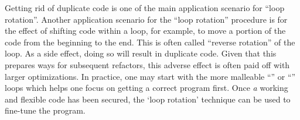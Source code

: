 Getting rid of duplicate code is one of the main application scenario for ``loop rotation''.
Another application scenario for the ``loop rotation'' procedure is for the effect of
shifting code within a loop, for example, to move a portion of the code from the beginning to the
end.
This is often called ``reverse rotation'' of the loop.
As a side effect, doing so will result in duplicate code.
Given that this prepares ways for subsequent refactors, this adverse effect is often paid
off with larger optimizations.
In practice, one may start with the more malleable ``'' or
``'' loops which
helps one focus on getting a correct program first.
Once \emph{a} working and flexible code has been secured,
the `loop rotation' technique can be used to fine-tune the program.
